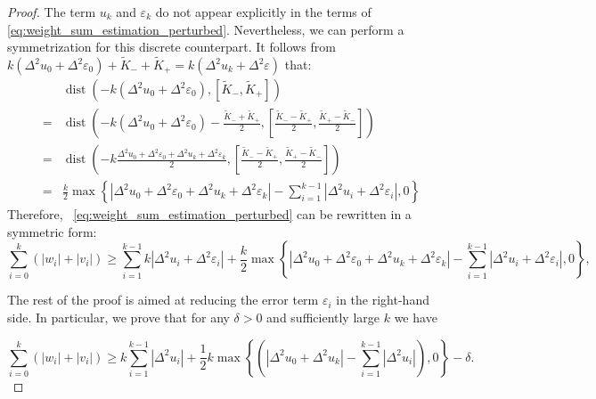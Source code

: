 \documentclass[12pt]{amsart}
\numberwithin{equation}{section}
\theoremstyle{remark}
\begin{document}
\begin{proof}
The term $u_k$ and $\varepsilon_k$ do not appear explicitly in the terms of \eqref{eq:weight_sum_estimation_perturbed}. Nevertheless, we can perform a symmetrization for this discrete counterpart.
It follows from $k(\Delta^2 u_0+\Delta^2 \varepsilon_0)+\widetilde K_-+\widetilde K_{+} = k(\Delta^2 u_k+\Delta^2\varepsilon)$ that:
\begin{equation}
    \begin{aligned}
        &\operatorname{dist}\left( - k(\Delta^2 u_0+\Delta^2 \varepsilon_0),[\widetilde K_-, \widetilde K_+] \right) \\
        =&\operatorname{dist}\left( - k\left(\Delta^2 u_0+\Delta^2 \varepsilon_0\right)-\frac{\widetilde K_-+\widetilde K_+}{2},\left[\frac{\widetilde K_--\widetilde K_+}{2}, \frac{\widetilde K_+-\widetilde K_-}{2}\right] \right)\\
        = & \operatorname{dist}\left( -k\frac{\Delta^2 u_0+\Delta^2 \varepsilon_0+\Delta^2 u_k+\Delta^2\varepsilon_k}{2},\left[\frac{\widetilde K_--\widetilde K_+}{2}, \frac{\widetilde K_+-\widetilde K_-}{2}\right] \right)\\
        =& \frac{k}{2} \max\left\{|\Delta^2 u_0+\Delta^2 \varepsilon_0 + \Delta^2 u_k+\Delta^2 \varepsilon_k|-\sum_{i=1}^{k-1} |\Delta^2 u_i+\Delta^2 \varepsilon_i|, 0\right\}
    \end{aligned}
\end{equation}
Therefore, ~\eqref{eq:weight_sum_estimation_perturbed} can be rewritten in a symmetric form:
\begin{equation}
\label{eq:weight_sum_estimation_perturbed_symmetric}
 \sum_{i=0}^{k} (|w_i|+|v_i|)\ge \sum_{i=1}^{k-1} k|\Delta^2 u_i+\Delta^2 \varepsilon_i| + \frac{k}{2} \max\left\{|\Delta^2 u_0+\Delta^2 \varepsilon_0 + \Delta^2 u_k+\Delta^2 \varepsilon_k|-\sum_{i=1}^{k-1} |\Delta^2 u_i+\Delta^2 \varepsilon_i|, 0\right\},
\end{equation}

The rest of the proof is aimed at reducing the error term $\varepsilon_i$ in the right-hand side. In particular, we prove that for any $\delta > 0$
and sufficiently large $k$ we have

\begin{equation}
    \sum_{i=0}^k \left(|w_i|+|v_i|\right)\ge k\sum_{i=1}^{k-1} |\Delta^2 u_i|+ \frac 1 2 k\max \left\{ \left( |\Delta^2 u_0 + \Delta^2 u_k|-\sum_{i=1}^{k-1} |\Delta^2 u_i|\right), 0 \right\}- \delta.
\end{equation}



\end{proof}
\end{document}
